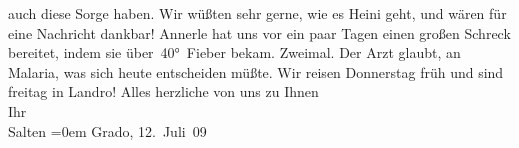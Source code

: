 \begin{ledgroupsized}[t]{13cm}
               auch diese Sorge haben. Wir wüßten sehr gerne, wie es Heini geht, und wären für eine Nachricht dankbar!\pend
           \pstart
           Annerle hat uns vor ein paar Tagen einen
               großen Schreck bereitet, indem sie über 40° Fieber bekam. Zweimal. Der Arzt glaubt, an Malaria, was
               sich heute entscheiden müßte.\pend
           \pstart
           Wir reisen Donnerstag{ }früh und sind freitag in Landro!\pend
           \pstart
           Alles herzliche von uns zu Ihnen {\\[\baselineskip]}Ihr {\\[\baselineskip]}\spacefill\mbox{Salten}\pend
           \leftskip=0em{}\pstart
           Grado, 12. Juli 09\pend
           
         
         \endnumbering{}\end{ledgroupsized}  \newcommand{\dateiname}{L03502}\newcommand{\titel}{Felix Salten an Arthur Schnitzler, 12. 7. 1909}\newcommand{\editorInnen}{Martin Anton Müller und Laura Untner}
      